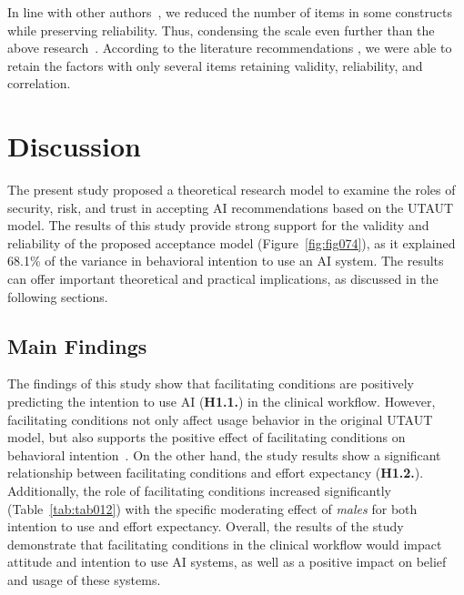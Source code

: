In line with other authors~\cite{https://doi.org/10.1111/joca.12267, snyder2020oxford}, we reduced the number of items in some constructs while preserving reliability.
Thus, condensing  the scale even further than the above research~\cite{KHALILZADEH2017460}.
According to the literature recommendations \cite{SIGERSON201887}, we were able to retain the factors with only several items retaining validity, reliability, and correlation.

\section{Discussion}
\label{sec:chap004006}

The present study proposed a theoretical research model to examine the roles of security, risk, and trust in accepting AI recommendations based on the UTAUT model.
The results of this study provide strong support for the validity and reliability of the proposed acceptance model (Figure~\ref{fig:fig074}), as it explained 68.1\% of the variance in behavioral intention to use an AI system.
The results can offer important theoretical and practical implications, as discussed in the following sections.

\subsection{Main Findings}
\label{sec:chap004006001}

The findings of this study show that facilitating conditions are positively predicting the intention to use AI ({\bf H1.1.}) in the clinical workflow.
However, facilitating conditions not only affect usage behavior in the original UTAUT model, but also supports the positive effect of facilitating conditions on behavioral intention~\cite{DWIVEDI2016174, Seethamraju2018}.
On the other hand, the study results show a significant relationship between facilitating conditions and effort expectancy ({\bf H1.2.}).
Additionally, the role of facilitating conditions increased significantly (Table~\ref{tab:tab012}) with the specific moderating effect of {\it males} for both intention to use and effort expectancy.
Overall, the results of the study demonstrate that facilitating conditions in the clinical workflow would impact attitude and intention to use AI systems, as well as a positive impact on belief and usage of these systems.

